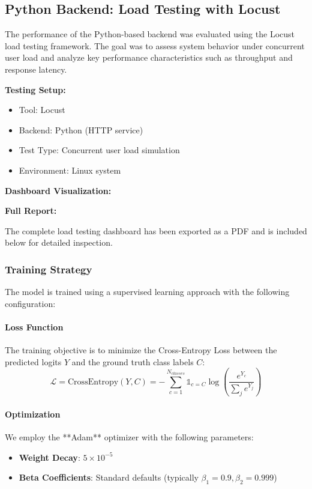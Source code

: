 \documentclass[10pt,a4paper,twocolumn]{article}
\begin{document}



\subsection{Python Backend: Load Testing with Locust}

The performance of the Python-based backend was evaluated using the Locust load testing framework. The goal was to assess system behavior under concurrent user load and analyze key performance characteristics such as throughput and response latency.

\textbf{Testing Setup:}
\begin{itemize}
    \item Tool: Locust
    \item Backend: Python (HTTP service)
    \item Test Type: Concurrent user load simulation
    \item Environment: Linux system
\end{itemize}

\textbf{Dashboard Visualization:}

\textbf{Full Report:}

The complete load testing dashboard has been exported as a PDF and is included below for detailed inspection.




\subsubsection{Training Strategy}
The model is trained using a supervised learning approach with the following configuration:

\paragraph{Loss Function}
The training objective is to minimize the Cross-Entropy Loss between the predicted logits $Y$ and the ground truth class labels $C$:
\begin{equation}
    \mathcal{L} = \text{CrossEntropy}(Y, C) = -\sum_{c=1}^{N_{classes}} \mathbb{1}_{c=C} \log\left(\frac{e^{Y_c}}{\sum_{j} e^{Y_j}}\right)
\end{equation}

\paragraph{Optimization}
We employ the **Adam** optimizer with the following parameters:
\begin{itemize}
    \item \textbf{Weight Decay}: $5 \times 10^{-5}$
    \item \textbf{Beta Coefficients}: Standard defaults (typically $\beta_1=0.9, \beta_2=0.999$)
\end{itemize}
\end{document}

